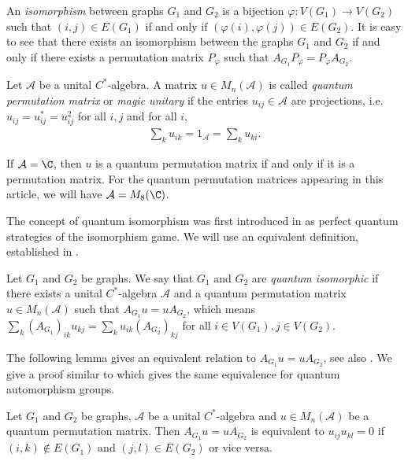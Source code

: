 An \emph{isomorphism} between graphs $G_1$ and $G_2$ is a bijection $\varphi:V(G_1) \to V(G_2)$ such that $(i,j)\in E(G_1)$ if and only if $(\varphi(i), \varphi(j))\in E(G_2)$. It is easy to see that there exists an isomorphism between the graphs $G_1$ and $G_2$ if and only if there exists a permutation matrix $P_{\varphi}$ such that $A_{G_1}P_{\varphi}=P_{\varphi}A_{G_2}$. 

\begin{defi}
Let $\mathcal{A}$ be a unital $C^*$-algebra. A matrix $u\in M_n(\mathcal{A})$ is called \emph{quantum permutation matrix} or \emph{magic unitary} if the entries $u_{ij}\in \mathcal{A}$ are projections, i.e. $u_{ij}=u_{ij}^*=u_{ij}^2$ for all $i,j$ and for all $i$,
\begin{align*}
    \sum_k u_{ik}=1_{\mathcal{A}}=\sum_k u_{ki}.
\end{align*}
\end{defi}
If $\mathcal{A}=\C$, then $u$ is a quantum permutation matrix if and only if it is a permutation matrix. For the quantum permutation matrices appearing in this article, we will have $\mathcal{A}=M_8(\C)$. 

The concept of quantum isomorphism was first introduced in \cite{AMRSSV} as perfect quantum strategies of the isomorphism game. We will use an equivalent definition, established in \cite{LMR}. 

\begin{defi}
Let $G_1$ and $G_2$ be graphs. We say that $G_1$ and $G_2$ are \emph{quantum isomorphic} if there exists a unital $C^*$-algebra $\mathcal{A}$ and a quantum permutation matrix $u\in M_n(\mathcal{A})$ such that $A_{G_1}u=uA_{G_2}$, which means $\sum_k(A_{G_1})_{ik}u_{kj}=\sum_k u_{ik}(A_{G_2})_{kj}$ for all $i\in V(G_1), j \in V(G_2)$.
\end{defi}

The following lemma gives an equivalent relation to $A_{G_1}u=uA_{G_2}$, see also \cite[Theorem 2.2 and Theorem 2.5]{LMR}. We give a proof similar to \cite[Proposition 2.1.3]{Sthesis} which gives the same equivalence for quantum automorphism groups. 

\begin{lemm}\label{lemprod0}
Let $G_1$ and $G_2$ be graphs, $\mathcal{A}$ be a unital $C^*$-algebra and $u\in M_n(\mathcal{A})$ be a quantum permutation matrix. Then $A_{G_1}u=uA_{G_2}$ is equivalent to $u_{ij}u_{kl}=0$ if $(i,k)\notin E(G_1)$ and $(j,l)\in E(G_2)$ or vice versa.
\end{lemm}

